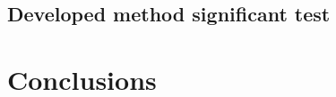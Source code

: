 \documentclass[a4paper,12pt,titlepage]{article} %
\numberwithin{equation}{section}  %
\begin{document}
	\subsection{Developed method significant test}
\label{sec: test}



	\section{Conclusions}
	\label{sec:conclution}
	
	
	
	
	
	

	
	
\end{document}
